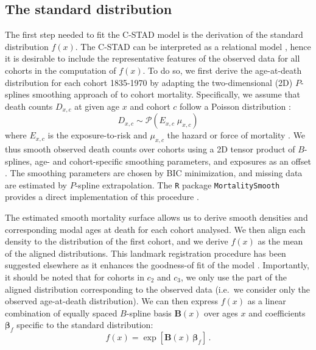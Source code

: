 \documentclass[11pt, a4paper]{article}
\begin{document}
\subsection{The standard distribution}
\label{Subsec:Standard}
The first step needed to fit the C-STAD model is the derivation of the standard distribution $f(x)$. The C-STAD can be interpreted as a relational model \citep{brass1971scale}, hence it is desirable to include the representative features of the observed data for all cohorts in the computation of $f(x)$. To do so, we first derive the age-at-death distribution for each cohort 1835-1970 by adapting the two-dimensional (2D) $P$-splines smoothing approach of \cite{currie2004smoothing} to cohort mortality. Specifically, we assume that death counts $D_{x,c}$ at given age $x$ and cohort $c$ follow a Poisson distribution \citep{brillinger1986biometrics}:
%
\begin{equation}\label{Eq:Poisson}
D_{x,c} \sim \mathcal{P}(E_{x,c} \; \mu_{x,c}) 
\end{equation}
%
where $E_{x,c}$ is the exposure-to-risk and $\mu_{x,c}$ the hazard or force of mortality \cite[such as in, for example,][]{brouhns2002poisson}. We thus smooth observed death counts over cohorts using a 2D tensor product of  $B$-splines, age- and cohort-specific smoothing parameters, and exposures as an offset \citep{eilers1996flexible}. The smoothing parameters are chosen by BIC minimization, and missing data are estimated by $P$-spline extrapolation. The \texttt{R} package \texttt{MortalitySmooth} provides a direct implementation of this procedure \citep{camarda2012mortalitysmooth}. 

The estimated smooth mortality surface allows us to derive smooth densities and corresponding modal ages at death for each cohort analysed. We then align each density to the distribution of the first cohort, and we derive $f(x)$ as the mean of the aligned distributions. This landmark registration procedure has been suggested elsewhere as it enhances the goodness-of fit of the model \cite[for additional details, see][]{basellini2019modelling}. Importantly, it should be noted that for cohorts in $c_2$ and $c_3$, we only use the part of the aligned distribution corresponding to the observed data (i.e.~we consider only the observed age-at-death distribution). We can then express $f(x)$ as a linear combination of equally spaced $B$-spline basis $\bm{B}(x)$ over ages $x$ and coefficients $\bm{\beta}_{f}$ specific to the standard distribution:
%
\begin{equation}\label{Eq:standPsplines}
f(x) = \exp\left[ \bm{B}(x) \, \bm{\beta}_{f} \right] \, .
\end{equation}
%
\end{document}
